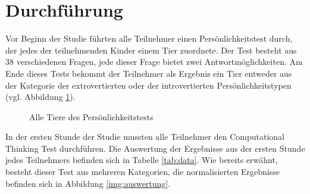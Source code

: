 \section{Durchführung}
	Vor Beginn der Studie führten alle Teilnehmer einen Persönlichkeitstest durch, der jedes der teilnehmenden Kinder einem Tier zuordnete. Der Test besteht aus 38 verschiedenen Fragen, jede dieser Frage bietet zwei Antwortmöglichkeiten. Am Ende dieses Tests bekommt der Teilnehmer als Ergebnis ein Tier entweder aus der Kategorie der extrovertierten oder der introvertierten Persönlichkeitstypen (vgl. Abbildung \ref{img:animals}). 
	\begin{figure}[htbp!]
		\centering
		\caption[Alle Tiere des Persönlichkeitstests]{Alle Tiere des Persönlichkeitstests \cite{knowAndLove}}
		\label{img:animals}
	\end{figure} 
	In der ersten Stunde der Studie mussten alle Teilnehmer den Computational Thinking Test durchführen. Die Auswertung der Ergebnisse aus der ersten Stunde jedes Teilnehmers befinden sich in Tabelle \ref{tab:data}. Wie bereits erwähnt, besteht dieser Test aus mehreren Kategorien, die normalisierten Ergebnisse befinden sich in Abbildung \ref{img:auswertung}.\\
